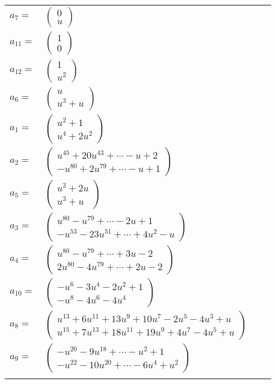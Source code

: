 \documentclass[1p]{elsarticle_modified}
\theoremstyle{definition}
\begin{document}
\begin{tabular}{m{7pt} m{180pt} m{7pt} m{180pt} }
\flushright $a_{7}=$&$\begin{pmatrix}0\\u\end{pmatrix}$ \\
\flushright $a_{11}=$&$\begin{pmatrix}1\\0\end{pmatrix}$ \\
\flushright $a_{12}=$&$\begin{pmatrix}1\\u^2\end{pmatrix}$ \\
\flushright $a_{6}=$&$\begin{pmatrix}u\\u^3+u\end{pmatrix}$ \\
\flushright $a_{1}=$&$\begin{pmatrix}u^2+1\\u^4+2 u^2\end{pmatrix}$ \\
\flushright $a_{2}=$&$\begin{pmatrix}u^{45}+20 u^{43}+\cdots- u+2\\- u^{80}+2 u^{79}+\cdots- u+1\end{pmatrix}$ \\
\flushright $a_{5}=$&$\begin{pmatrix}u^3+2 u\\u^3+u\end{pmatrix}$ \\
\flushright $a_{3}=$&$\begin{pmatrix}u^{80}- u^{79}+\cdots-2 u+1\\- u^{53}-23 u^{51}+\cdots+4 u^2- u\end{pmatrix}$ \\
\flushright $a_{4}=$&$\begin{pmatrix}u^{80}- u^{79}+\cdots+3 u-2\\2 u^{80}-4 u^{79}+\cdots+2 u-2\end{pmatrix}$ \\
\flushright $a_{10}=$&$\begin{pmatrix}- u^6-3 u^4-2 u^2+1\\- u^8-4 u^6-4 u^4\end{pmatrix}$ \\
\flushright $a_{8}=$&$\begin{pmatrix}u^{13}+6 u^{11}+13 u^9+10 u^7-2 u^5-4 u^3+u\\u^{15}+7 u^{13}+18 u^{11}+19 u^9+4 u^7-4 u^5+u\end{pmatrix}$ \\
\flushright $a_{9}=$&$\begin{pmatrix}- u^{20}-9 u^{18}+\cdots- u^2+1\\- u^{22}-10 u^{20}+\cdots-6 u^4+u^2\end{pmatrix}$\\&\end{tabular}
\end{document}
